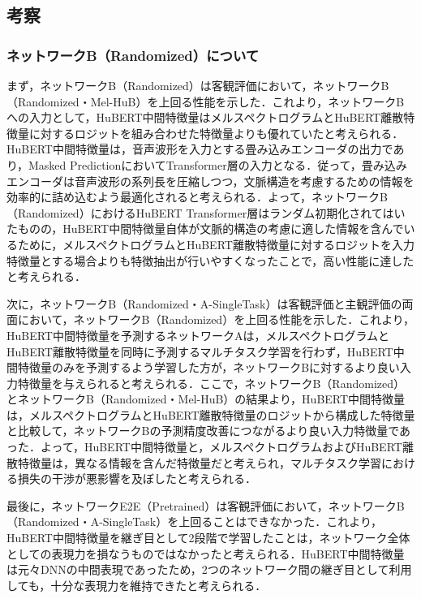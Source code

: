 \subsection{考察}
\subsubsection{ネットワークB（Randomized）について}
まず，ネットワークB（Randomized）は客観評価において，ネットワークB（Randomized・Mel-HuB）を上回る性能を示した．これより，ネットワークBへの入力として，HuBERT中間特徴量はメルスペクトログラムとHuBERT離散特徴量に対するロジットを組み合わせた特徴量よりも優れていたと考えられる．HuBERT中間特徴量は，音声波形を入力とする畳み込みエンコーダの出力であり，Masked PredictionにおいてTransformer層の入力となる．従って，畳み込みエンコーダは音声波形の系列長を圧縮しつつ，文脈構造を考慮するための情報を効率的に詰め込むよう最適化されると考えられる．よって，ネットワークB（Randomized）におけるHuBERT Transformer層はランダム初期化されてはいたものの，HuBERT中間特徴量自体が文脈的構造の考慮に適した情報を含んでいるために，メルスペクトログラムとHuBERT離散特徴量に対するロジットを入力特徴量とする場合よりも特徴抽出が行いやすくなったことで，高い性能に達したと考えられる．

次に，ネットワークB（Randomized・A-SingleTask）は客観評価と主観評価の両面において，ネットワークB（Randomized）を上回る性能を示した．これより，HuBERT中間特徴量を予測するネットワークAは，メルスペクトログラムとHuBERT離散特徴量を同時に予測するマルチタスク学習を行わず，HuBERT中間特徴量のみを予測するよう学習した方が，ネットワークBに対するより良い入力特徴量を与えられると考えられる．ここで，ネットワークB（Randomized）とネットワークB（Randomized・Mel-HuB）の結果より，HuBERT中間特徴量は，メルスペクトログラムとHuBERT離散特徴量のロジットから構成した特徴量と比較して，ネットワークBの予測精度改善につながるより良い入力特徴量であった．よって，HuBERT中間特徴量と，メルスペクトログラムおよびHuBERT離散特徴量は，異なる情報を含んだ特徴量だと考えられ，マルチタスク学習における損失の干渉が悪影響を及ぼしたと考えられる．

最後に，ネットワークE2E（Pretrained）は客観評価において，ネットワークB（Randomized・A-SingleTask）を上回ることはできなかった．これより，HuBERT中間特徴量を継ぎ目として2段階で学習したことは，ネットワーク全体としての表現力を損なうものではなかったと考えられる．HuBERT中間特徴量は元々DNNの中間表現であったため，2つのネットワーク間の継ぎ目として利用しても，十分な表現力を維持できたと考えられる．

